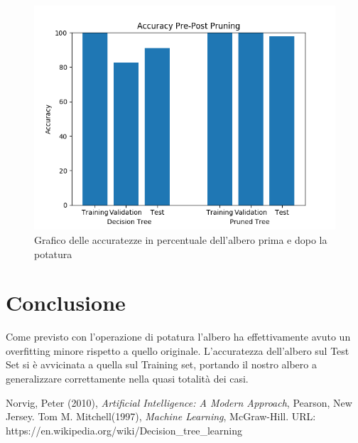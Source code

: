 \documentclass[]{article}
\begin{document}
\begin{figure}[H]
	\includegraphics[width=\linewidth]{graph_breast_cancer_dataset.png}
	\caption{Grafico delle accuratezze in percentuale dell'albero prima e dopo la potatura}
	\label{imgGrafico}
\end{figure}


\section*{Conclusione}
Come previsto con l'operazione di potatura l'albero ha effettivamente avuto un overfitting minore rispetto a quello originale. L'accuratezza dell'albero sul Test Set si è avvicinata a quella sul Training set, portando il nostro albero a generalizzare correttamente nella quasi totalità dei casi.


\begin{thebibliography}{9}
Norvig, Peter (2010),
\emph{Artificial Intelligence: A Modern Approach}, Pearson, New Jersey.
Tom M. Mitchell(1997),
\emph{Machine Learning}, McGraw-Hill.
URL: https://en.wikipedia.org/wiki/Decision\_tree\_learning
\end{thebibliography}
\end{document}
